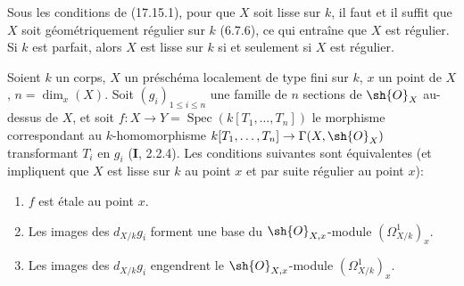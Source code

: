 \begin{corollary}[17.15.2]
\label{IV.17.15.2}
Sous les conditions de \textup{(17.15.1)}, pour que $X$ soit lisse sur $k$, il faut et il suffit que $X$ soit géométriquement régulier sur $k$ \textup{(6.7.6)}, ce qui entraîne que $X$ est régulier. Si $k$ est parfait, alors $X$ est lisse sur $k$ si et seulement si $X$ est régulier.
\end{corollary}

\begin{proposition}[17.15.3]
\label{IV.17.15.3}
Soient $k$ un corps, $X$ un préschéma localement de type fini sur $k$, $x$ un point de $X$, $n=\dim_x(X)$. Soit $(g_i)_{1\leq i\leq n}$ une famille de $n$ sections de $\sh{O}_X$ au-dessus de $X$, et soit $f:X\to Y=\operatorname{Spec}(k[T_1,\ldots,T_n])$ le morphisme correspondant au $k$-homomorphisme $k[T_1,\ldots,T_n]\to\Gamma(X,\sh{O}_X)$ transformant $T_i$ en $g_i$ \textup{(\textbf{I}, 2.2.4)}. Les conditions suivantes sont équivalentes (et impliquent que $X$ est lisse sur $k$ au point $x$ \textup{et par suite} régulier \textup{au point} $x$):
\begin{enumerate}
  \item[\textup{a)}] $f$ est étale au point $x$.
  \item[\textup{b)}] Les images des $d_{X/k}g_i$ forment une base du $\sh{O}_{X,x}$-module $(\varOmega^1_{X/k})_x$.
  \item[\textup{c)}] Les images des $d_{X/k}g_i$ engendrent le $\sh{O}_{X,x}$-module $(\varOmega^1_{X/k})_x$.
\end{enumerate}
\end{proposition}

